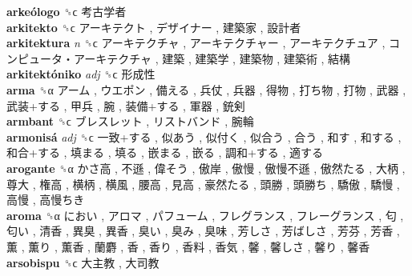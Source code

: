 \textbf{arkeólogo} ␝ϲ   考古学者   \\
\textbf{arkitekto} ␝ϲ   アーキテクト ,  デザイナー ,  建築家 ,  設計者   \\
\textbf{arkitektura} \emph{n}  ␝ϲ   アーキテクチャ ,  アーキテクチャー ,  アーキテクチュア ,  コンピュータ・アーキテクチャ ,  建築 ,  建築学 ,  建築物 ,  建築術 ,  結構   \\
\textbf{arkitektóniko} \emph{adj}  ␝ϲ   形成性   \\
\textbf{arma} ␝α   アーム ,  ウエポン ,  備える ,  兵仗 ,  兵器 ,  得物 ,  打ち物 ,  打物 ,  武器 ,  武装+する ,  甲兵 ,  腕 ,  装備+する ,  軍器 ,  銃剣   \\
\textbf{armbant} ␝ϲ   ブレスレット ,  リストバンド ,  腕輪   \\
\textbf{armonisá} \emph{adj}  ␝ϲ   一致+する ,  似あう ,  似付く ,  似合う ,  合う ,  和す ,  和する ,  和合+する ,  填まる ,  填る ,  嵌まる ,  嵌る ,  調和+する ,  適する   \\
\textbf{arogante} ␝α   かさ高 ,  不遜 ,  偉そう ,  傲岸 ,  傲慢 ,  傲慢不遜 ,  傲然たる ,  大柄 ,  尊大 ,  権高 ,  横柄 ,  横風 ,  腰高 ,  見高 ,  豪然たる ,  頭勝 ,  頭勝ち ,  驕傲 ,  驕慢 ,  高慢 ,  高慢ちき   \\
\textbf{aroma} ␝α   におい ,  アロマ ,  パフューム ,  フレグランス ,  フレーグランス ,  匂 ,  匂い ,  清香 ,  異臭 ,  異香 ,  臭い ,  臭み ,  臭味 ,  芳しさ ,  芳ばしさ ,  芳芬 ,  芳香 ,  薫 ,  薫り ,  薫香 ,  蘭麝 ,  香 ,  香り ,  香料 ,  香気 ,  馨 ,  馨しさ ,  馨り ,  馨香   \\
\textbf{arsobispu} ␝ϲ   大主教 ,  大司教   \\
